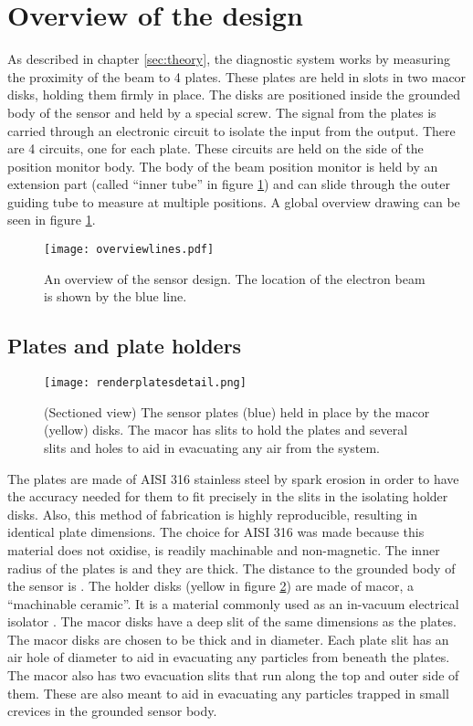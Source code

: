 \section{Overview of the design}
As described in chapter \ref{sec:theory}, the diagnostic system works by measuring the proximity of the beam to 4 plates. These plates are held in slots in two macor disks, holding them firmly in place. The disks are positioned inside the grounded body of the sensor and held by a special screw. The signal from the plates is carried through an electronic circuit to isolate the input from the output. There are 4 circuits, one for each plate. These circuits are held on the side of the position monitor body. The body of the beam position monitor is held by an extension part (called ``inner tube'' in figure \ref{fig:designoverview}) and can slide through the outer guiding tube to measure at multiple positions. A global overview drawing can be seen in figure \ref{fig:designoverview}.

\begin{figure}[h]
 \centering
 \texttt{[image: overviewlines.pdf]}
 \caption{An overview of the sensor design. The location of the electron beam is shown by the blue line.}
 \label{fig:designoverview}
\end{figure}

\subsection{Plates and plate holders}

\begin{figure}[H]
 \centering
 \texttt{[image: renderplatesdetail.png]}
 \caption{(Sectioned view) The sensor plates (blue) held in place by the macor (yellow) disks. The macor has slits to hold the plates and several slits and holes to aid in evacuating any air from the system.}
 \label{fig:plates}
\end{figure}

The plates are made of AISI 316 stainless steel by spark erosion in order to have the accuracy needed for them to fit precisely in the slits in the isolating holder disks. Also, this method of fabrication is highly reproducible, resulting in identical plate dimensions. The choice for AISI 316 was made because this material does not oxidise, is readily machinable and non-magnetic. 
The inner radius of the plates is  and they are  thick. The distance to the grounded body of the sensor is .
The holder disks (yellow in figure \ref{fig:plates}) are made of macor, a ``machinable ceramic''. It is a material commonly used as an in-vacuum electrical isolator . The macor disks have a  deep slit of the same dimensions as the plates. The macor disks are chosen to be  thick and  in diameter. Each plate slit has an air hole of  diameter to aid in evacuating any particles from beneath the plates. The macor also has two evacuation slits that run along the top and outer side of them. These are also meant to aid in evacuating any particles trapped in small crevices in the grounded sensor body.


